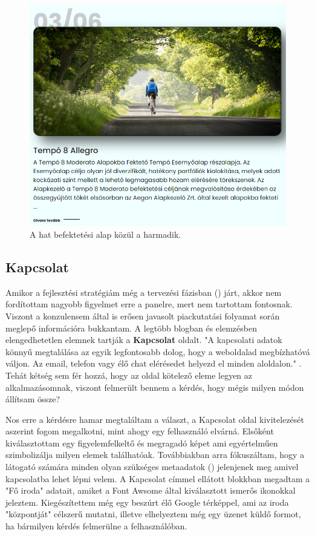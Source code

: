 \begin{figure}[h]
\centering
\includegraphics[scale=0.5]{images/invest.png}
\caption{A hat befektetési alap közül a harmadik.}
\end{figure}

\subsection{Kapcsolat}

Amikor a fejlesztési stratégiám még a tervezési fázisban () járt, akkor nem fordítottam nagyobb figyelmet erre a panelre, mert nem tartottam fontosnak. Viszont a konzulensem által is erősen javasolt piackutatási folyamat során meglepő információra bukkantam. A legtöbb blogban és elemzésben elengedhetetlen elemnek tartják a \textbf{Kapcsolat} oldalt. "A kapcsolati adatok könnyű megtalálása az egyik legfontosabb dolog, hogy a weboldalad megbízhatóvá váljon. Az email, telefon vagy élő chat elérésedet helyezd el minden aloldalon."  \cite{contact}. Tehát kétség sem fér hozzá, hogy az oldal kötelező eleme legyen az alkalmazásomnak, viszont felmerült bennem a kérdés, hogy mégis milyen módon állítsam össze? 

	Nos erre a kérdésre hamar megtaláltam a választ, a Kapcsolat oldal kivitelezését aszerint fogom megalkotni, mint ahogy egy felhasználó elvárná. Elsőként kiválasztottam egy figyelemfelkeltő és megragadó képet ami egyértelműen szimbolizálja milyen elemek találhatóak. Továbbiakban arra fókuszáltam, hogy a látogató számára minden olyan szükséges metaadatok () jelenjenek meg amivel kapcsolatba lehet lépni velem. A Kapcsolat címmel ellátott blokkban megadtam a "Fő iroda" adatait, amiket a Font Awsome által kiválasztott ismerős ikonokkal jeleztem. Kiegészítettem még egy beszúrt élő Google térképpel, ami az iroda "központját" célszerű mutatni, illetve elhelyeztem még egy üzenet küldő formot, ha bármilyen kérdés felmerülne a felhasználóban.

